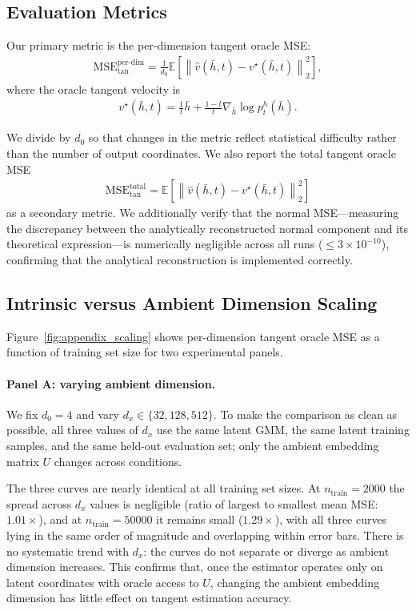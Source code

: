 \subsection{Evaluation Metrics}

Our primary metric is the per-dimension tangent oracle MSE:
\begin{align}
\mathrm{MSE}_{\mathrm{tan}}^{\mathrm{per\text{-}dim}}
=
\frac{1}{d_0}
\mathbb{E}
\left[
\left\|
\hat{v}(\bar{h}, t) - v^\star(\bar{h}, t)
\right\|_2^2
\right],
\end{align}
where the oracle tangent velocity is
\begin{align}
v^\star(\bar{h}, t)
=
\frac{1}{t}\bar{h}
+
\frac{1-t}{t}
\nabla_{\bar{h}} \log p_t^h(\bar{h}).
\end{align}

We divide by $d_0$ so that changes in the metric reflect statistical difficulty rather than the number of output coordinates. We also report the total tangent oracle MSE
\begin{align}
\mathrm{MSE}_{\mathrm{tan}}^{\mathrm{total}}
=
\mathbb{E}
\left[
\left\|
\hat{v}(\bar{h}, t) - v^\star(\bar{h}, t)
\right\|_2^2
\right]
\end{align}
as a secondary metric. We additionally verify that the normal MSE—measuring the discrepancy between the analytically reconstructed normal component and its theoretical expression—is numerically negligible across all runs ($\leq 3 \times 10^{-10}$), confirming that the analytical reconstruction is implemented correctly.

\subsection{Intrinsic versus Ambient Dimension Scaling}

Figure~\ref{fig:appendix_scaling} shows per-dimension tangent oracle MSE as a function of training set size for two experimental panels.

\paragraph{Panel A: varying ambient dimension.}
We fix $d_0 = 4$ and vary $d_x \in \{32, 128, 512\}$. To make the comparison as clean as possible, all three values of $d_x$ use the same latent GMM, the same latent training samples, and the same held-out evaluation set; only the ambient embedding matrix $U$ changes across conditions.

The three curves are nearly identical at all training set sizes. At $n_{\mathrm{train}} = 2000$ the spread across $d_x$ values is negligible (ratio of largest to smallest mean MSE: $1.01\times$), and at $n_{\mathrm{train}} = 50000$ it remains small ($1.29\times$), with all three curves lying in the same order of magnitude and overlapping within error bars. There is no systematic trend with $d_x$: the curves do not separate or diverge as ambient dimension increases. This confirms that, once the estimator operates only on latent coordinates with oracle access to $U$, changing the ambient embedding dimension has little effect on tangent estimation accuracy.

